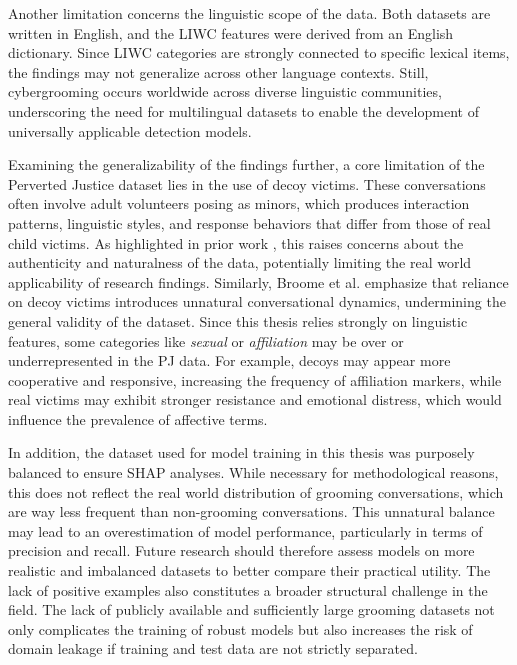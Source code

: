 Another limitation concerns the linguistic scope of the data. Both datasets are written in English, and the LIWC features were derived from an English dictionary. Since LIWC categories are strongly connected to specific lexical items, the findings may not generalize across other language contexts. Still, cybergrooming occurs worldwide across diverse linguistic communities, underscoring the need for multilingual datasets to enable the development of universally applicable detection models.  

Examining the generalizability of the findings further, a core limitation of the Perverted Justice dataset lies in the use of decoy victims. These conversations often involve adult volunteers posing as minors, which produces interaction patterns, linguistic styles, and response behaviors that differ from those of real child victims. As highlighted in prior work \cite{chiangandgrant2017online}, this raises concerns about the authenticity and naturalness of the data, potentially limiting the real world applicability of research findings. Similarly, Broome et al. \cite{broome2020psycholinguistic} emphasize that reliance on decoy victims introduces unnatural conversational dynamics, undermining the general validity of the dataset. Since this thesis relies strongly on linguistic features, some categories like \textit{sexual} or \textit{affiliation} may be over or underrepresented in the PJ data. For example, decoys may appear more cooperative and responsive, increasing the frequency of affiliation markers, while real victims may exhibit stronger resistance and emotional distress, which would influence the prevalence of affective terms.  

In addition, the dataset used for model training in this thesis was purposely balanced to ensure SHAP analyses. While necessary for methodological reasons, this does not reflect the real world distribution of grooming conversations, which are way less frequent than non-grooming conversations. This unnatural balance may lead to an overestimation of model performance, particularly in terms of precision and recall. Future research should therefore assess models on more realistic and imbalanced datasets to better compare their practical utility. The lack of positive examples also constitutes a broader structural challenge in the field. The lack of publicly available and sufficiently large grooming datasets not only complicates the training of robust models but also increases the risk of domain leakage if training and test data are not strictly separated.  

